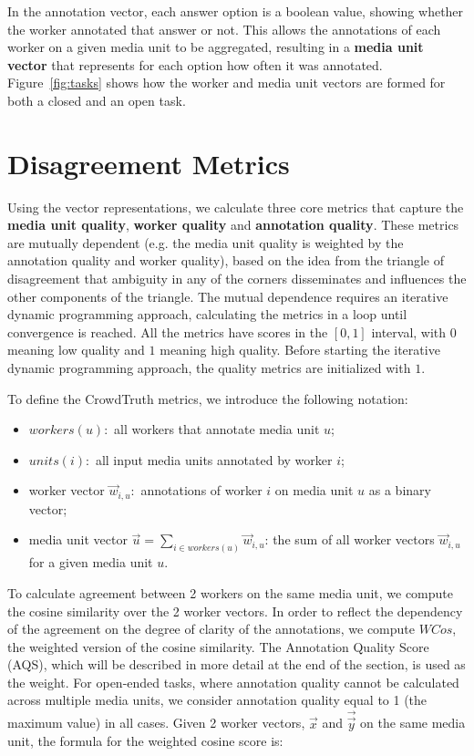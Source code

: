 In the annotation vector, each answer option is a boolean value, showing whether the worker annotated that answer or not. This allows the annotations of each worker on a given media unit to be aggregated, resulting in a \textbf{media unit vector} that represents for each option how often it was annotated. Figure~\ref{fig:tasks} shows how the worker and media unit vectors are formed for both a closed and an open task.

\section{Disagreement Metrics}
\label{app:metrics}

Using the vector representations, we calculate three core metrics that capture the \textbf{media unit quality}, \textbf{worker quality} and \textbf{annotation quality}. These metrics are mutually dependent (e.g. the media unit quality is weighted by the annotation quality and worker quality), based on the idea from the triangle of disagreement that ambiguity in any of the corners disseminates and influences the other components of the triangle. The mutual dependence requires an iterative dynamic programming approach, calculating the metrics in a loop until convergence is reached. All the metrics have scores in the $[0,1]$ interval, with $0$ meaning low quality and $1$ meaning high quality. Before starting the iterative dynamic programming approach, the quality metrics are initialized with $1$. %

To define the CrowdTruth metrics, we introduce the following notation:
\begin{itemize}
\item $workers(u):$ all workers that annotate media unit $u$;
\item $units(i):$ all input media units annotated by worker $i$;
\item worker vector $\vec{w}_{i, u}:$ annotations of worker $i$ on media unit $u$ as a binary vector;
\item media unit vector $\vec{u} = \sum\limits_{i \in workers(u)} \vec{w}_{i,u}$: the sum of all worker vectors $\vec{w}_{i,u}$ for a given media unit $u$.
\end{itemize}

To calculate agreement between 2 workers on the same media unit, we compute the cosine similarity over the 2 worker vectors. In order to reflect the dependency of the agreement on the degree of clarity of the annotations, we compute $WCos$, the weighted version of the cosine similarity. The Annotation Quality Score (AQS), which will be described in more detail at the end of the section, is used as the weight. For open-ended tasks, where annotation quality cannot be calculated across multiple media units, we consider annotation quality equal to 1 (the maximum value) in all cases. Given 2 worker vectors, $\vec{x}$ and $\vec{\vec{y}}$ on the same media unit, the formula for the weighted cosine score is:

